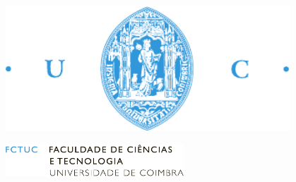 \begin{titlepage}
\thispagestyle{empty}

\begin{center}
\includegraphics[width=0.8\textwidth]{images/fctuc.pdf}
\par 	%
\vspace{5mm}
\includegraphics[width=0.5\textwidth]{images/fctuctext.pdf}
\par

\vspace{2cm}
{\Huge{\textbf{\thesistitle}}\par}

\vspace{2.5cm}
{\large \textbf{\myname}}

\vfill
{\large{\statedate}}

\end{center}
\end{titlepage}
